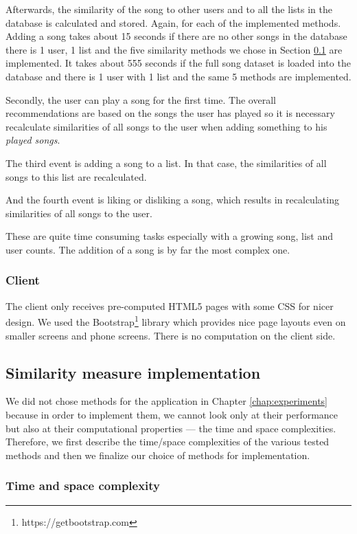 Afterwards, the similarity of the song to other users and to all the lists in the database is calculated and stored. Again, for each of the implemented methods. Adding a song takes about 15 seconds if there are no other songs in the database there is 1 user, 1 list and the five similarity methods we chose in Section \ref{ssec:measure_implementation} are implemented. It takes about 555 seconds if the full song dataset is loaded into the database and there is 1 user with 1 list and the same 5 methods are implemented. 

Secondly, the user can play a song for the first time. The overall recommendations are based on the songs the user has played so it is necessary recalculate similarities of all songs to the user when adding something to his \textit{played songs}.

The third event is adding a song to a list. In that case, the similarities of all songs to this list are recalculated. 

And the fourth event is liking or disliking a song, which results in recalculating similarities of all songs to the user. 

These are quite time consuming tasks especially with a growing song, list and user counts. The addition of a song is by far the most complex one. 

\subsubsection{Client}
The client only receives pre-computed HTML5 pages with some CSS for nicer design. We used the Bootstrap\footnote{https://getbootstrap.com} library which provides nice page layouts even on smaller screens and phone screens. There is no computation on the client side.

\subsection{Similarity measure implementation}\label{ssec:measure_implementation}

We did not chose methods for the application in Chapter \ref{chap:experiments} because in order to implement them, we cannot look only at their performance but also at their computational properties --- the time and space complexities. Therefore, we first describe the time/space complexities of the various tested methods and then we finalize our choice of methods for implementation.


\subsubsection{Time and space complexity}

